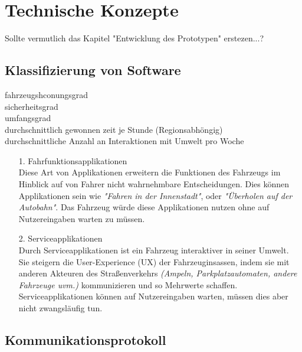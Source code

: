 \section{Technische Konzepte}\label{technische_konzepte}
Sollte vermutlich das Kapitel "Entwicklung des Prototypen" erstezen...?\\

\subsection{Klassifizierung von Software}\label{sw_klassifizierung}
fahrzeugshconungsgrad\\
sicherheitsgrad\\
umfangsgrad\\
durchschnittlich gewonnen zeit je Stunde (Regionsabhöngig)\\
durchschnittliche Anzahl an Interaktionen mit Umwelt pro Woche\\

\begin{itemize}
	\item[1.] Fahrfunktionsapplikationen\\
	Diese Art von Applikationen erweitern die Funktionen des Fahrzeugs im Hinblick auf von Fahrer nicht wahrnehmbare Entscheidungen. Dies können Applikationen sein wie \textit{"Fahren in der Innenstadt"}, oder \textit{"Überholen auf der Autobahn"}. Das Fahrzeug würde diese Applikationen nutzen ohne auf Nutzereingaben warten zu müssen.
	
	\item[2.] Serviceapplikationen\\
	Durch Serviceapplikationen ist ein Fahrzeug interaktiver in seiner Umwelt. Sie steigern die User-Experience (UX) der Fahrzeuginsassen, indem sie mit anderen Akteuren des Straßenverkehrs \textit{(Ampeln, Parkplatzautomaten, andere Fahrzeuge uvm.)} kommunizieren und so Mehrwerte schaffen. Serviceapplikationen können auf Nutzereingaben warten, müssen dies aber nicht zwangsläufig tun.
\end{itemize}

\subsection{Kommunikationsprotokoll}